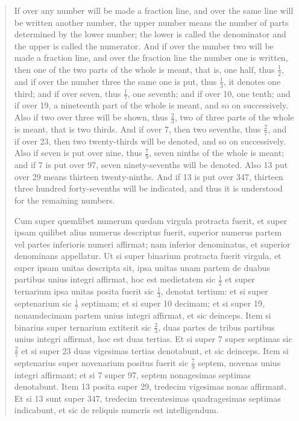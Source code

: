 \documentclass{article}
\begin{document}
\begin{quote}
If over any number will be made a fraction line, and over the same line
will be written another number, the upper number means the number of parts
determined by the lower number; the lower is called the denominator and the
upper is called the numerator. And if over the number two will be made a 
fraction line, and over the fraction line the number one is written, then one of
the two parts of the whole is meant, that is, one half, thus $\frac{1}{2}$, and if over the number
three the same one is put, thus $\frac{1}{3}$, it denotes one third; and if over seven, thus
$\frac{1}{7}$, one seventh; and if over 10, one tenth; and if over 19, a nineteenth part of
the whole is meant, and so on successively. Also if two over three will be shown,
thus $\frac{2}{3}$, two of three parts of the whole is meant, that is two thirds. And if
over 7, then two sevenths, thus $\frac{2}{7}$, and if over 23, then two twenty-thirds will
be denoted, and so on successively. Also if seven is put over nine, thus $\frac{7}{9}$, seven
ninths of the whole is meant; and if 7 is put over 97, seven ninety-sevenths will
be denoted. Also 13 put over 29 means thirteen twenty-ninths. And if 13 is put
over 347, thirteen three hundred forty-sevenths will be indicated, and thus it  is
understood for the remaining numbers.

Cum super quemlibet numerum quedam virgula protracta fuerit, et super ipsam
quilibet alius numerus descriptus fuerit, superior numerus partem vel partes inferioris
numeri affirmat; nam inferior denominatus, et superior denominans appellatur. Ut si super
binarium protracta fuerit virgula, et super ipsam unitas descripta sit, ipsa unitas unam
partem de duabus partibus unius integri affirmat, hoc est medietatem sic $\frac{1}{2}$ et super
ternarium ipsa unitas posita fuerit sic $\frac{1}{3}$, denotat tertium: et si super septenarium sic
$\frac{1}{7}$ septimam; et si super 10 decimam; et si super 19, nonamdecimam partem unius integri
affirmat, et sic deinceps. Item si binarius super ternarium extiterit sic $\frac{2}{3}$, duas partes
de tribus partibus unius integri affirmat, hoc est duas tertias. Et si super 7 super septimas
sic $\frac{2}{7}$ et si super 23 duas vigesimas tertias denotabunt, et sic deinceps. Item si
septenarius super novenarium positus fuerit sic $\frac{7}{9}$ septem, novenas unius integri affirmant;
et si 7 super 97, septem nonagesimas septimas denotabunt. Item 13 posita super 29, tredecim
vigesimas nonas affirmant. Et si 13 sunt super 347, tredecim trecentesimas quadragesimas
septimas indicabunt, et sic de reliquis numeris est intelligendum.
\end{quote}
\end{document}
